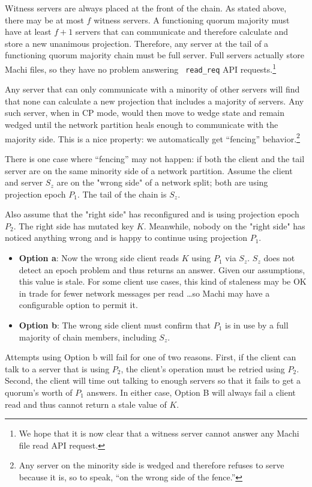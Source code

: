 \documentclass[preprint,10pt]{sigplanconf}
\begin{document}
Witness servers are always placed at the front of the chain.  As stated
above, there may be at most $f$ witness servers.  A functioning quorum
majority
must have at least $f+1$ servers that can communicate and therefore
calculate and store a new unanimous projection.  Therefore, any server at
the tail of a functioning quorum majority chain must be full server.  Full servers
actually store Machi files, so they have no problem answering {\tt
  read\_req} API requests.\footnote{We hope that it is now clear that
  a witness server cannot answer any Machi file read API request.}

Any server that can only communicate with a minority of other servers will
find that none can calculate a new projection that includes a
majority of servers.  Any such server, when in CP mode, would then move to
wedge state and remain wedged until the network partition heals enough
to communicate with the majority side.  This is a nice property: we
automatically get ``fencing'' behavior.\footnote{Any server on the minority side
  is wedged and therefore refuses to serve because it is, so to speak,
  ``on the wrong side of the fence.''}

There is one case where ``fencing'' may not happen: if both the client
and the tail server are on the same minority side of a network partition.
Assume the client and server $S_z$ are on the "wrong side" of a network
split; both are using projection epoch $P_1$.  The tail of the
chain is $S_z$.

Also assume that the "right side" has reconfigured and is using
projection epoch $P_2$.  The right side has mutated key $K$.  Meanwhile,
nobody on the "right side" has noticed anything wrong and is happy to
continue using projection $P_1$.

\begin{itemize}
\item {\bf Option a}: Now the wrong side client reads $K$ using $P_1$ via
  $S_z$.  $S_z$ does not detect an epoch problem and thus returns an
  answer.  Given our assumptions, this value is stale.  For some
  client use cases, this kind of staleness may be OK in trade for
  fewer network messages per read \ldots so Machi may
  have a configurable option to permit it.
\item {\bf Option b}: The wrong side client must confirm that $P_1$ is
  in use by a full majority of chain members, including $S_z$.
\end{itemize}

Attempts using Option b will fail for one of two reasons.  First, if
the client can talk to a server that is using $P_2$, the client's
operation must be retried using $P_2$.  Second, the client will time
out talking to enough servers so that it fails to get a quorum's worth of
$P_1$ answers.  In either case, Option B will always fail a client
read and thus cannot return a stale value of $K$.
\end{document}
